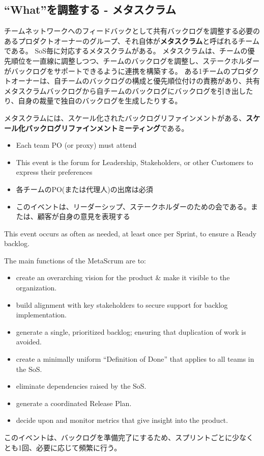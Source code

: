 \documentclass[12pt,a4paper,parskip=full]{scrartcl}
\begin{document}
\subsection{``What''を調整する - メタスクラム}
チームネットワークへのフィードバックとして共有バックログを調整する必要のあるプロダクトオーナーのグループ、それ自体が\textbf{メタスクラム}と呼ばれるチームである。
SoS毎に対応するメタスクラムがある。
メタスクラムは、チームの優先順位を一直線に調整しつつ、チームのバックログを調整し、ステークホルダーがバックログをサポートできるように連携を構築する。
ある1チームのプロダクトオーナーは、自チームのバックログの構成と優先順位付けの責務があり、共有メタスクラムバックログから自チームのバックログにバックログを引き出したり、自身の裁量で独自のバックログを生成したりする。

メタスクラムには、スケール化されたバックログリファインメントがある、\textbf{スケール化バックログリファインメントミーティング}である。
\begin{itemize}
\item Each team PO (or proxy) must attend
\item This event is the forum for Leadership, Stakeholders, or other
Customers to express their preferences
\end{itemize}
\fi
\begin{itemize}
\item 各チームのPO(または代理人)の出席は必須
\item このイベントは、リーダーシップ、ステークホルダーのための会である。または、顧客が自身の意見を表現する
\end{itemize}
This event occurs as often as needed, at least once per Sprint, to ensure a
Ready backlog. 

The main functions of the MetaScrum are to:
\begin{itemize}
\item create an overarching vision for the product \& make it visible to
the organization.
\item build alignment with key stakeholders to secure support for backlog
implementation.
\item generate a single, prioritized backlog; ensuring that duplication of
work is avoided.
\item create a minimally uniform ``Definition of Done'' that applies to all teams in
the SoS.
\item eliminate dependencies raised by the SoS.
\item generate a coordinated Release Plan.
\item decide upon and monitor metrics that give insight into the product.
\end{itemize}
\fi
このイベントは、バックログを準備完了にするため、スプリントごとに少なくとも1回、必要に応じて頻繁に行う。
\end{document}
